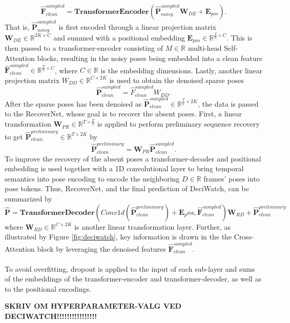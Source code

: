 \documentclass[./main.tex]{subfiles}
\begin{document}
\begin{equation}
    \hat{\bm{F}}_{clean} ^{sampled} = \textbf{TransformerEncoder} \left( \hat{\bm{P}}_{noisy} ^{sampled} \bm{W}_{DE} + \bm{E}_{pos} \right).
\end{equation}
That is, $\hat{\bm{P}}_{noisy} ^{sampled}$ is first encoded through a linear projection matrix $\bm{W}_{DE} \in \mathbb{R}^{2K \times C}$ and summed with a positional embedding $\bm{E}_{pos} \in \mathbb{R}^{\frac{T}{n} \times C}$. This is then passed to a transformer-encoder consisting of $M \in \mathbb{R}$ multi-head Self-Attention blocks, resulting in the noisy poses being embedded into a clean feature $\hat{\bm{F}}_{clean} ^{sampled} \in \mathbb{R}^{\frac{T}{n} \times C}$, where $C \in \mathbb{R}$ is the embedding dimensions. Lastly, another linear projection matrix $W_{DD} \in \mathbb{R}^{C \times 2K}$ is used to obtain the denoised sparse poses
\begin{equation}
    \hat{\bm{P}}_{clean} ^{sampled} = \hat{F}_{clean} ^{sampled} W_{DD}.
\end{equation}
After the sparse poses has been denoised as $\hat{\bm{P}}_{clean} ^{sampled} \in \mathbb{R}^{\frac{T}{n} \times 2K}$, the data is passed to the RecoverNet, whose goal is to recover the absent poses. First, a linear transformation $\bm{W}_{PR} \in \mathbb{R}^{T \times \frac{T}{n}}$ is applied to perform preliminary sequence recovery to get $\hat{\bm{P}}_{clean} ^{preliminary} \in \mathbb{R}^{T \times 2K}$ by
\begin{equation}
    \hat{\bm{P}}_{clean} ^{preliminary} = \bm{W}_{PR} \hat{\bm{P}}_{clean} ^{sampled}.
\end{equation}
To improve the recovery of the absent poses a transformer-decoder and positional embedding is used together with a 1D convolutional layer to bring temporal semantics into pose encoding to encode the neighboring $D \in \mathbb{R}$ frames' poses into pose tokens. Thus, RecoverNet, and the final prediction of DeciWatch, can be summarized by
\begin{equation}
    \hat{\bm{P}} = \textbf{TransformerDecoder}\left(Conv1d \left( \hat{\bm{P}}_{clean} ^{preliminary} \right) + \bm{E}_pos, \hat{\bm{F}}_{clean} ^{sampled} \right)\bm{W}_{RD} + \hat{\bm{P}}_{clean} ^{preliminary}
\end{equation}
where $\bm{W}_{RD} \in \mathbb{R}^{C \times 2K}$ is another linear transformation layer. Further, as illustrated by Figure \ref{fig:deciwatch}, key information is drawn in the the Cross-Attention block by leveraging the denoised features $\hat{\bm{F}}_{clean} ^{sampled}$.
\\
\\
To avoid overfitting, dropout is applied to the input of each sub-layer and sums of the embeddings of the transformer-encoder and transformer-decoder, as well as to the positional encodings.

\textbf{SKRIV OM HYPERPARAMETER-VALG VED DECIWATCH!!!!!!!!!!!!!!!!}
\end{document}
